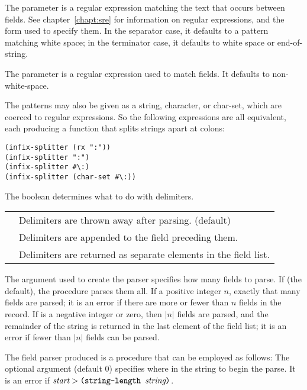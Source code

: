 \begin{desc}
    The  parameter is a regular expression matching the text
    that occurs between fields.
    See chapter~\ref{chapt:sre} for information on regular expressions,
    and the  form used to specify them.
    In the separator case, 
    it defaults to a pattern matching white space; 
    in the terminator case,
    it defaults to white space or end-of-string.

    The  parameter is a regular expression used
    to match fields. It defaults to non-white-space.

    The  patterns may also be given as a string, 
    character, or char-set, which are coerced to regular expressions.
    So the following expressions are all equivalent,
    each producing a function that splits strings apart at colons:
\begin{inset}
\begin{verbatim}
(infix-splitter (rx ":"))
(infix-splitter ":")
(infix-splitter #\:)
(infix-splitter (char-set #\:))\end{verbatim}
\end{inset}

    The boolean  determines what to do with delimiters.
    \begin{tightinset}\begin{tabular}{ll}
    \ex{'trim} &        Delimiters are thrown away after parsing. (default) \\
    \ex{'concat} &      Delimiters are appended to the field preceding them. \\
    \ex{'split} &       Delimiters are returned as separate elements in
                        the field list.
    \end{tabular}
    \end{tightinset}

    The  argument used to create the parser specifies how many
    fields to parse.  If  (the default), the procedure parses them all. 
    If a positive integer $n$, exactly that many fields are parsed; it is an
    error if there are more or fewer than $n$ fields in the record. If
     is a negative integer or zero, then $|n|$ fields 
    are parsed, and the remainder of the string is returned in the last
    element of the field list; it is an error if fewer than $|n|$ fields 
    can be parsed.
    
    The field parser produced is a procedure that can be employed as
    follows:
    The optional  argument (default 0) specifies where in the string
    to begin the parse. It is an error if
        $\var{start} > \ex{(string-length \var{string})}$.
    

\end{desc}
